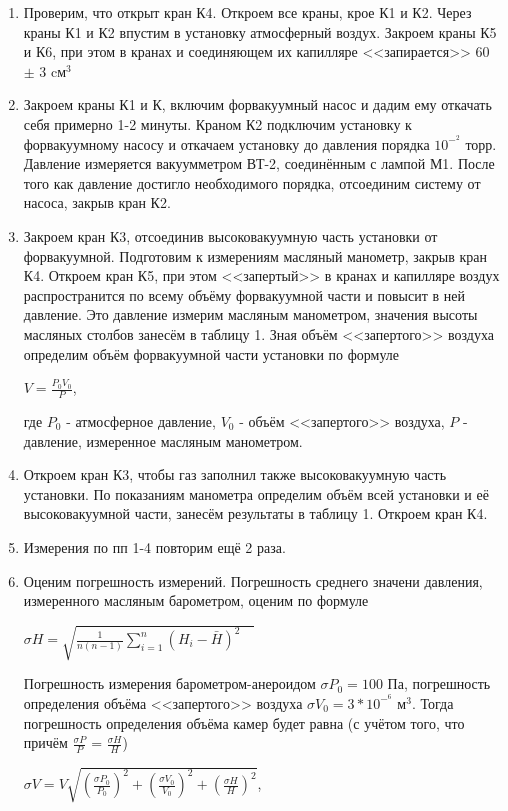 \documentclass[a4paper]{article}
\begin{document}
\begin{enumerate}
    \item Проверим, что открыт кран К4. Откроем все краны, крое К1 и К2. Через краны К1 и К2 впустим в установку атмосферный воздух. Закроем краны К5 и К6, при этом в кранах и соединяющем их капилляре <<запирается>> 60 $\pm$ 3 cм$^3$
    \item Закроем краны К1 и К, включим форвакуумный насос и дадим ему откачать себя примерно 1-2 минуты. Краном К2 подключим установку к форвакуумному насосу и откачаем установку до давления порядка $10^-^2$ торр. Давление измеряется вакуумметром ВТ-2, соединённым с лампой М1. После того как давление достигло необходимого порядка, отсоединим систему от насоса, закрыв кран К2.
    \item Закроем кран К3, отсоединив высоковакуумную часть установки от форвакуумной. Подготовим к измерениям масляный манометр, закрыв кран К4. Откроем кран К5, при этом <<запертый>> в кранах и капилляре воздух распространится по всему объёму форвакуумной части и повысит в ней давление. Это давление измерим масляным манометром, значения высоты масляных столбов занесём в таблицу 1. Зная объём <<запертого>> воздуха определим объём форвакуумной части установки по формуле
    \begin{center}
    $V = \frac{P_0 V_0}{P}$,
    \end{center}
    где $P_0$ - атмосферное давление, $V_0$ - объём <<запертого>> воздуха, $P$ - давление, измеренное масляным манометром.
    
    \item Откроем кран К3, чтобы газ заполнил также высоковакуумную часть установки. По показаниям манометра определим объём всей установки и её высоковакуумной части, занесём результаты в таблицу 1. Откроем кран К4.
    \item Измерения по пп 1-4 повторим ещё 2 раза. 
    \item Оценим погрешность измерений. Погрешность среднего значени давления, измеренного масляным барометром, оценим по формуле
    \begin{center}
        $\sigma H = \sqrt{\frac{1}{n(n-1)}\sum_{i=1}^n(H_i-\bar H)^2 \quad} $
    \end{center}
    Погрешность измерения барометром-анероидом $\sigma P_0= 100$ Па, погрешность определения объёма <<запертого>> воздуха $\sigma V_0 = 3* 10^-^6$ м$^3$. Тогда погрешность определения объёма камер будет равна (с учётом того, что     причём $\frac{\sigma P}{P}$ = $\frac{\sigma H}{H}$)
    \begin{center}
    $\sigma V = V\sqrt{(\frac{\sigma P_0}{P_0})^2+(\frac{\sigma V_0}{V_0})^2+(\frac{\sigma H}{H})^2} $,
    \end{center}


\end{enumerate}
\end{document}
